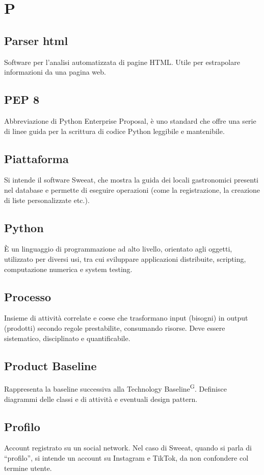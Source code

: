 \section{P}

\subsection{Parser html}
Software per l'analisi automatizzata di pagine HTML. Utile per estrapolare informazioni da una pagina web.

\subsection{PEP 8}
Abbreviazione di Python Enterprise Proposal, è uno standard che offre una serie di linee guida per la scrittura di codice Python leggibile e mantenibile. 


\subsection{Piattaforma} Si intende il software Sweeat, che mostra la guida dei locali gastronomici presenti nel database e permette di eseguire operazioni (come la registrazione, la creazione di liste personalizzate etc.).

\subsection{Python} 
È un linguaggio di programmazione ad alto livello, orientato agli oggetti, utilizzato per diversi usi, tra cui sviluppare applicazioni distribuite, scripting, computazione numerica e system testing. 

\subsection{Processo}
Insieme di attività correlate e coese che trasformano input (bisogni) in output (prodotti) secondo regole prestabilite, consumando risorse. Deve essere sistematico, disciplinato e quantificabile.

\subsection{Product Baseline}
Rappresenta la baseline successiva alla Technology Baseline\textsuperscript{G}. Definisce diagrammi delle classi e di attività e eventuali design pattern. 

\subsection{Profilo} Account registrato su un social network. Nel caso di Sweeat, quando si parla di “profilo”, si intende un account su Instagram e TikTok, da non confondere col termine utente.

